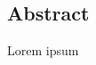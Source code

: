 \documentclass[preview]{standalone}
\begin{document}
\clearpage
\thispagestyle{empty}
\begin{center}
	\section*{Abstract}
\end{center}
Lorem ipsum 
\end{document}
